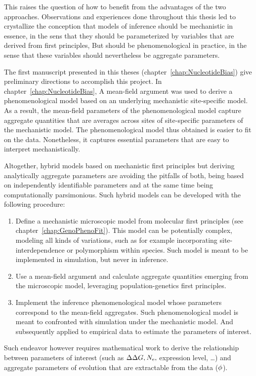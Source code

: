 This raises the question of how to benefit from the advantages of the two approaches.
Observations and experiences done throughout this thesis led to crystallize the conception that models of inference should be mechanistic in essence, in the sens that they should be parameterized by variables that are derived from first principles,
But should be phenomenological in practice, in the sense that these variables should nevertheless be aggregate parameters.

The first manuscript presented in this theses (chapter~\ref{chap:NucleotideBias}) give preliminary directions to accomplish this project.
In chapter~\ref{chap:NucleotideBias}, A mean-field argument was used to derive a phenomenological model based on an underlying mechanistic site-specific model.
As a result, the mean-field parameters of the phenomenological model capture aggregate quantities that are averages across sites of site-specific parameters of the mechanistic model.
The phenomenological model thus obtained is easier to fit on the data.
Nonetheless, it captures essential parameters that are easy to interpret mechanistically.

Altogether, hybrid models based on mechanistic first principles but deriving analytically aggregate parameters are avoiding the pitfalls of both, being based on independently identifiable parameters and at the same time being computationally parsimonious.
Such hybrid models can be developed with the following procedure:
\begin{enumerate}
    \item Define a mechanistic microscopic model from molecular first principles (see chapter~\ref{chap:GenoPhenoFit}).
        This model can be potentially complex, modeling all kinds of variations, such as for example incorporating site-interdependence or polymorphism within species.
        Such model is meant to be implemented in simulation, but never in inference.
    \item Use a mean-field argument and calculate aggregate quantities emerging from the microscopic model, leveraging population-genetics first principles.
    \item Implement the inference phenomenological model whose parameters correspond to the mean-field aggregates.
        Such phenomenological model is meant to confronted with simulation under the mechanistic model.
        And subsequently applied to empirical data to estimate the parameters of interest.
\end{enumerate}
Such endeavor however requires mathematical work to derive the relationship between parameters of interest (such as $\Delta \Delta G, N_{\textrm{e}}, $ expression level, \ldots) and aggregate parameters of evolution that are extractable from the data ($\phi$).

